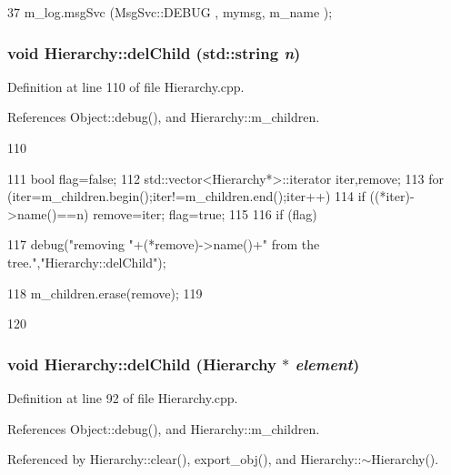 \begin{DoxyCode}
37 { m_log.msgSvc (MsgSvc::DEBUG   , mymsg, m_name ); }
\end{DoxyCode}
\hypertarget{classHierarchy_a1928ac7615fe0b5e55cd707f70dc6781}{
\subsubsection[{delChild}]{\setlength{\rightskip}{0pt plus 5cm}void Hierarchy::delChild (std::string {\em n})}}
\label{classHierarchy_a1928ac7615fe0b5e55cd707f70dc6781}


Definition at line 110 of file Hierarchy.cpp.

References Object::debug(), and Hierarchy::m\_\-children.


\begin{DoxyCode}
110                                    {
111   bool flag=false;
112   std::vector<Hierarchy*>::iterator iter,remove;
113   for (iter=m_children.begin();iter!=m_children.end();iter++){
114     if ((*iter)->name()==n){ remove=iter; flag=true;}
115   }
116   if (flag){
117     debug("removing "+(*remove)->name()+" from the tree.","Hierarchy::delChild");
      
118     m_children.erase(remove);
119   }
120 }
\end{DoxyCode}
\hypertarget{classHierarchy_a2b2b359fac003233f65786a616766bde}{
\subsubsection[{delChild}]{\setlength{\rightskip}{0pt plus 5cm}void Hierarchy::delChild ({\bf Hierarchy} $\ast$ {\em element})}}
\label{classHierarchy_a2b2b359fac003233f65786a616766bde}


Definition at line 92 of file Hierarchy.cpp.

References Object::debug(), and Hierarchy::m\_\-children.

Referenced by Hierarchy::clear(), export\_\-obj(), and Hierarchy::$\sim$Hierarchy().


